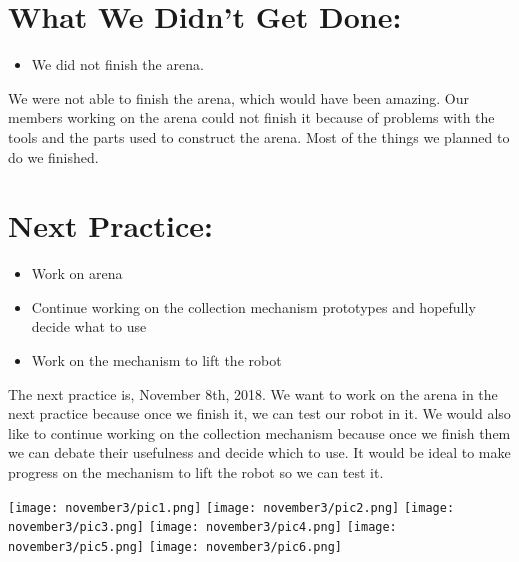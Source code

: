 \documentclass[12pt]{article}
\begin{document}
\section{What We Didn't Get Done:} %
\begin{itemize}
	\item We did not finish the arena.
\end{itemize}

We were not able to finish the arena, which would have been amazing. Our members working on the arena could not finish it because of problems with the tools and the parts used to construct the arena. Most of the things we planned to do we finished.

\section{Next Practice:}
\begin{itemize}
\item Work on arena
\item Continue working on the collection mechanism prototypes and hopefully decide what to use
\item Work on the mechanism to lift the robot
\end{itemize}

The next practice is, November 8th, 2018. %
We want to work on the arena in the next practice because once we finish it, we can test our robot in it. We would also like to continue working on the collection mechanism because once we finish them we can debate their usefulness and decide which to use. It would be ideal to make progress on the mechanism to lift the robot so we can test it.

\texttt{[image: november3/pic1.png]}
\texttt{[image: november3/pic2.png]}
\texttt{[image: november3/pic3.png]}
\texttt{[image: november3/pic4.png]}
\texttt{[image: november3/pic5.png]}
\texttt{[image: november3/pic6.png]}
\end{document}
